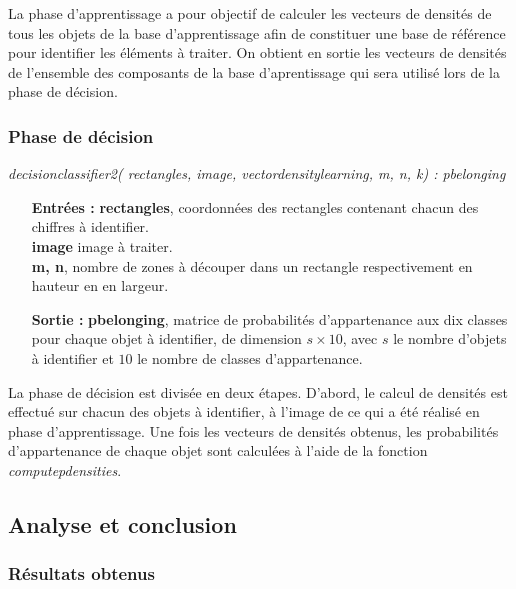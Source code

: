 La phase d'apprentissage a pour objectif de calculer les vecteurs de densités de tous les objets de la base d'apprentissage afin de constituer une base de référence pour identifier les éléments à traiter. On obtient en sortie les vecteurs de densités de l'ensemble des composants de la base d'aprentissage qui sera utilisé lors de la phase de décision.

\subsubsection{Phase de décision}

\textit{decisionclassifier2( rectangles, image, vectordensitylearning, m, n, k) : pbelonging}
\\
\begin{itemize}
	\item[\textbf{Entrées :}] \textbf{rectangles}, coordonnées des rectangles contenant chacun des chiffres à identifier. \\\textbf{image} image à traiter. \\\textbf{m, n}, nombre de zones à découper dans un rectangle respectivement en hauteur en en largeur.
	\item[\textbf{Sortie :}] \textbf{pbelonging}, matrice de probabilités d'appartenance aux dix classes pour chaque objet à identifier, de dimension $s \times 10$, avec $s$ le nombre d'objets à identifier et $10$ le nombre de classes d'appartenance.
\end{itemize}

La phase de décision est divisée en deux étapes. D'abord, le calcul de densités est effectué sur chacun des objets à identifier, à l'image de ce qui a été réalisé en phase d'apprentissage. Une fois les vecteurs de densités obtenus, les probabilités d'appartenance de chaque objet sont calculées à l'aide de la fonction \textit{computepdensities}.

\subsection{Analyse et conclusion}

\subsubsection{Résultats obtenus}

